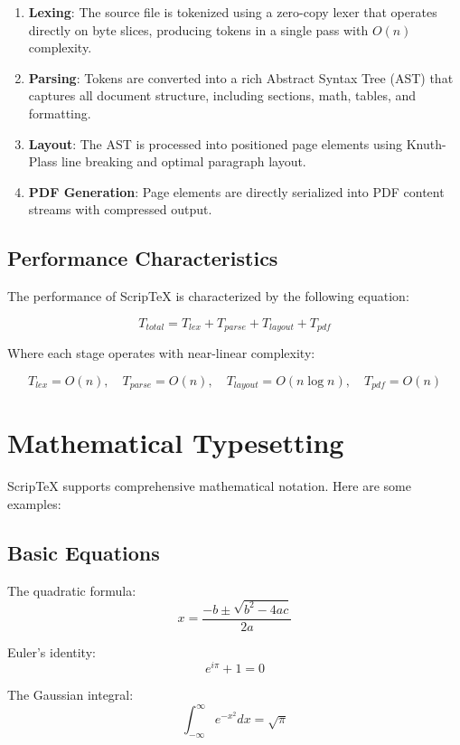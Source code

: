 \documentclass[12pt,a4paper]{article}
\begin{document}
\begin{enumerate}
\item \textbf{Lexing}: The source file is tokenized using a zero-copy lexer that operates directly on byte slices, producing tokens in a single pass with $O(n)$ complexity.
\item \textbf{Parsing}: Tokens are converted into a rich Abstract Syntax Tree (AST) that captures all document structure, including sections, math, tables, and formatting.
\item \textbf{Layout}: The AST is processed into positioned page elements using Knuth-Plass line breaking and optimal paragraph layout.
\item \textbf{PDF Generation}: Page elements are directly serialized into PDF content streams with compressed output.
\end{enumerate}

\subsection{Performance Characteristics}

The performance of ScripTeX is characterized by the following equation:

$$T_{total} = T_{lex} + T_{parse} + T_{layout} + T_{pdf}$$

Where each stage operates with near-linear complexity:

\begin{equation}
T_{lex} = O(n), \quad T_{parse} = O(n), \quad T_{layout} = O(n \log n), \quad T_{pdf} = O(n)
\end{equation}

\section{Mathematical Typesetting}

ScripTeX supports comprehensive mathematical notation. Here are some examples:

\subsection{Basic Equations}

The quadratic formula:
$$x = \frac{-b \pm \sqrt{b^2 - 4ac}}{2a}$$

Euler's identity:
$$e^{i\pi} + 1 = 0$$

The Gaussian integral:
$$\int_{-\infty}^{\infty} e^{-x^2} dx = \sqrt{\pi}$$
\end{document}
